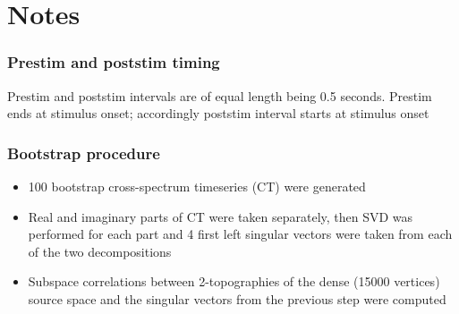 \documentclass{article}
\begin{document}







\justify
\section{Notes}

\subsubsection{Prestim and poststim timing}
Prestim and  poststim intervals are of equal length being 0.5 seconds.
Prestim ends at stimulus onset; accordingly poststim interval starts at stimulus  onset

\subsubsection{Bootstrap procedure}
\begin{itemize}
    \item 100 bootstrap cross-spectrum timeseries (CT) were generated
    \item Real and imaginary parts of CT were taken separately, then
          SVD was performed for each part and 4 first left singular vectors were taken
          from each of the two decompositions
    \item Subspace correlations between 2-topographies of the dense (15000 vertices)
          source space and the singular vectors from the previous step were computed
\end{itemize}
\end{document}
